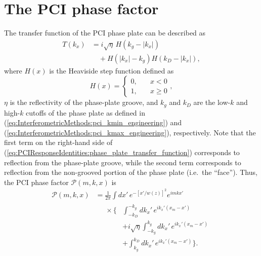 \section{The PCI phase factor}
The transfer function of the PCI phase plate can be described as
\begin{equation}
  \begin{aligned}
    T(k_x)
    &=
    i \sqrt{\eta} \, H(k_g - |k_x|)
    \\
    &\quad +
    H(|k_x| - k_g)
    H(k_D - |k_x|),
  \end{aligned}
  \label{eq:PCIResponseIdentities:phase_plate_transfer_function}
\end{equation}
where $H(x)$ is the Heaviside step function defined as
\begin{equation}
  H(x)
  =
  \begin{cases}
    0, \quad &x < 0 \\
    1, \quad &x \geq 0
  \end{cases},
  \label{eq:PCIResponseIdentities:Heaviside_step_function}
\end{equation}
$\eta$ is the reflectivity of the phase-plate groove, and
$k_g$ and $k_D$ are the low-$k$ and high-$k$ cutoffs of the phase plate
as defined in
(\ref{eq:InterferometricMethods:pci_kmin_engineering}) and
(\ref{eq:InterferometricMethods:pci_kmax_engineering}), respectively.
Note that the first term on the right-hand side of
(\ref{eq:PCIResponseIdentities:phase_plate_transfer_function})
corresponds to reflection from the phase-plate groove, while
the second term corresponds to reflection
from the non-grooved portion of the phase plate (i.e.\ the ``face'').
Thus, the PCI phase factor $\mathcal{P}(m, k, x)$ is
\begin{equation}
  \begin{aligned}
    \mathcal{P}(m, k, x)
    &=
    \frac{1}{2 \pi}
    \int dx' \,
    e^{-\left[ x' / w(z) \right]^2}
    e^{i m k x'}
    \\
    &\begin{aligned}
      \quad
      \times
      \Biggl\{%
        &\int_{-k_D}^{-k_g} dk_x' \,
        e^{i k_x' (x_m - x')}
        \\
        &+
        i \sqrt{\eta}
        \int_{-k_g}^{k_g} dk_x' \,
        e^{i k_x' (x_m - x')}
        \\
        &+
        \int_{k_g}^{k_D} dk_x' \,
        e^{i k_x' (x_m - x')}
      \Biggr\}.
    \end{aligned}
  \end{aligned}
  \label{eq:PCIResponseIdentities:mth_diffracted_beam_kx_filtered_phase_factor_near_field_integrals}
\end{equation}


